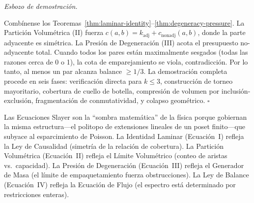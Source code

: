 \documentclass[11pt, a4paper, openany]{book}
\renewenvironment{proof}[1][Demostraci\'on]{%
  \par\noindent\textit{#1.}\quad
}{\hfill$\square$\par\medskip}
\begin{document}
\begin{proof}[Esbozo de demostraci\'on]
Comb\'inense los
Teoremas~\ref{thm:laminar-identity}--\ref{thm:degeneracy-pressure}. La
Partici\'on Volum\'etrica (II) fuerza
$c(a,b) = k_{\mathrm{adj}} + c_{\mathrm{nonadj}}(a,b)$, donde la
parte adyacente es sim\'etrica. La Presi\'on de Degeneraci\'on (III)
acota el presupuesto no-adyacente total. Cuando todos los pares est\'an
maximalmente sesgados (todas las razones cerca de 0 o 1), la cota de
emparejamiento se viola, contradicci\'on. Por lo tanto, al menos un par
alcanza balance $\geq 1/3$. La demostraci\'on completa procede en seis
fases: verificaci\'on directa para $k \leq 3$, construcci\'on de
torneo mayoritario, cobertura de cuello de botella, compresi\'on de
volumen por inclusi\'on-exclusi\'on, fragmentaci\'on de conmutatividad,
y colapso geom\'etrico.
\end{proof}

\noindent
Las Ecuaciones Slayer son la ``sombra matem\'atica'' de la f\'isica
porque gobiernan la misma estructura---el politopo de extensiones
lineales de un poset finito---que subyace al esparcimiento de Poisson.
La Identidad Laminar (Ecuaci\'on~I) refleja la Ley de Causalidad
(simetr\'ia de la relaci\'on de cobertura). La Partici\'on Volum\'etrica
(Ecuaci\'on~II) refleja el L\'imite Volum\'etrico (conteo de aristas
vs.\ capacidad). La Presi\'on de Degeneraci\'on (Ecuaci\'on~III) refleja
el Generador de Masa (el l\'imite de empaquetamiento fuerza
obstrucciones). La Ley de Balance (Ecuaci\'on~IV) refleja la Ecuaci\'on
de Flujo (el espectro est\'a determinado por restricciones enteras).
\end{document}
